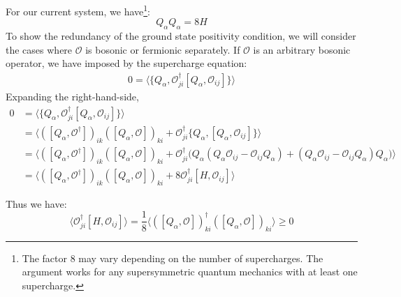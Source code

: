 \documentclass[11pt]{article}
\renewcommand{\ev}[1]{\langle #1 \rangle} %
\begin{document}
For our current system, we have\footnote{The factor $8$ may vary depending on the number of supercharges. The argument works for any supersymmetric quantum mechanics with at least one supercharge.}:
\begin{equation}
    Q_\alpha Q_\alpha= 8H 
\end{equation}
To show the redundancy of the ground state positivity condition, we will consider the cases where $\mathcal{O}$ is bosonic or fermionic separately. If $\mathcal{O}$ is an arbitrary bosonic operator, we have imposed by the supercharge equation:
\begin{equation}
    \begin{split}
        0=\ev{\{Q_\alpha, \mathcal{O}_{ji}^\dagger [Q_\alpha, \mathcal{O}_{ij}]\}}
    \end{split}
\end{equation}
Expanding the right-hand-side,
\begin{equation}
    \begin{split}
        0&=\ev{\{Q_\alpha, \mathcal{O}_{ji}^\dagger [Q_\alpha, \mathcal{O}_{ij}]\}}\\
&=\ev{([Q_\alpha, \mathcal{O}^\dagger])_{ik}([Q_\alpha, \mathcal{O}])_{ki}+\mathcal{O}_{ji}^\dagger \{Q_{\alpha},[Q_\alpha, \mathcal{O}_{ij}]\}}\\
&=\ev{([Q_\alpha, \mathcal{O}^\dagger])_{ik}([Q_\alpha, \mathcal{O}])_{ki}+\mathcal{O}_{ji}^\dagger\big( Q_\alpha(Q_\alpha \mathcal{O}_{ij}- \mathcal{O}_{ij} Q_\alpha)+(Q_\alpha \mathcal{O}_{ij}- \mathcal{O}_{ij} Q_\alpha) Q_\alpha \big)}\\
&=\ev{([Q_\alpha, \mathcal{O}^\dagger])_{ik}([Q_\alpha, \mathcal{O}])_{ki}+8 \mathcal{O}_{ji}^\dagger [H, \mathcal{O}_{ij}]}
    \end{split}
\end{equation}

Thus we have:
\begin{equation}
    \ev{\mathcal{O}_{ji}^\dagger [H, \mathcal{O}_{ij}]}=\frac{1}{8}\ev{([Q_\alpha, \mathcal{O}])_{ki}^\dagger([Q_\alpha, \mathcal{O}])_{ki}}\geq 0
\end{equation}
\end{document}
